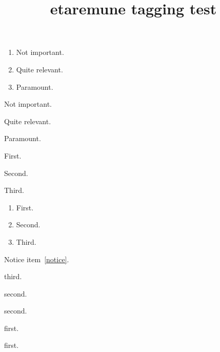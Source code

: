 \documentclass{article}
\title{etaremune tagging test}
\begin{document}
\begin{enumerate}
\item Not important.
\item Quite relevant.
\item Paramount.
\end{enumerate}

\begin{etaremune}
\item Not important.
\item Quite relevant.
\item Paramount.
\end{etaremune}

\begin{etaremune}[start=5]
\item First.
\item Second.
\item Third.
\end{etaremune}

\renewcommand{\labelenumi}{\theenumi)}
\renewcommand{\theenumii}{\roman{enumii}}
\begin{enumerate}
\item First.
\item Second.
\item Third.
\end{enumerate}
Notice item~\ref{notice}.

\begin{etaremune}[itemsep=0pt,parsep=0pt]
\item third.
\item second.
\begin{etaremune}
\item second.
\item first.
\end{etaremune}
\item first.
\end{etaremune}
\end{document}
